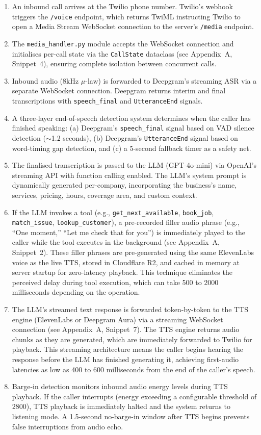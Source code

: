 \documentclass[conference]{IEEEtran}
\begin{document}
\begin{enumerate}
\item An inbound call arrives at the Twilio phone number. Twilio's webhook triggers the \texttt{/voice} endpoint, which returns TwiML instructing Twilio to open a Media Stream WebSocket connection to the server's \texttt{/media} endpoint.
\item The \texttt{media\_handler.py} module accepts the WebSocket connection and initialises per-call state via the \texttt{CallState} dataclass (see Appendix~A, Snippet~4), ensuring complete isolation between concurrent calls.
\item Inbound audio (8kHz $\mu$-law) is forwarded to Deepgram's streaming ASR via a separate WebSocket connection. Deepgram returns interim and final transcriptions with \texttt{speech\_final} and \texttt{UtteranceEnd} signals.
\item A three-layer end-of-speech detection system determines when the caller has finished speaking: (a) Deepgram's \texttt{speech\_final} signal based on VAD silence detection ($\sim$1.2 seconds), (b) Deepgram's \texttt{UtteranceEnd} signal based on word-timing gap detection, and (c) a 5-second fallback timer as a safety net.
\item The finalised transcription is passed to the LLM (GPT-4o-mini) via OpenAI's streaming API with function calling enabled. The LLM's system prompt is dynamically generated per-company, incorporating the business's name, services, pricing, hours, coverage area, and custom context.
\item If the LLM invokes a tool (e.g., \texttt{get\_next\_available}, \texttt{book\_job}, \texttt{match\_issue}, \texttt{lookup\_customer}), a pre-recorded filler audio phrase (e.g., ``One moment,'' ``Let me check that for you'') is immediately played to the caller while the tool executes in the background (see Appendix~A, Snippet~2). These filler phrases are pre-generated using the same ElevenLabs voice as the live TTS, stored in Cloudflare R2, and cached in memory at server startup for zero-latency playback. This technique eliminates the perceived delay during tool execution, which can take 500 to 2000 milliseconds depending on the operation.
\item The LLM's streamed text response is forwarded token-by-token to the TTS engine (ElevenLabs or Deepgram Aura) via a streaming WebSocket connection (see Appendix~A, Snippet~7). The TTS engine returns audio chunks as they are generated, which are immediately forwarded to Twilio for playback. This streaming architecture means the caller begins hearing the response before the LLM has finished generating it, achieving first-audio latencies as low as 400 to 600 milliseconds from the end of the caller's speech.
\item Barge-in detection monitors inbound audio energy levels during TTS playback. If the caller interrupts (energy exceeding a configurable threshold of 2800), TTS playback is immediately halted and the system returns to listening mode. A 1.5-second no-barge-in window after TTS begins prevents false interruptions from audio echo.
\end{enumerate}
\end{document}
